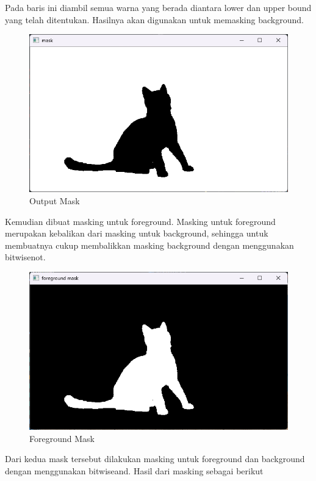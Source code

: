 \documentclass[]{article}
\begin{document}

Pada baris ini diambil semua warna yang berada diantara lower dan upper bound yang telah ditentukan. Hasilnya akan digunakan untuk memasking background.
\begin{figure}[H]
    \centering
    \includegraphics[width=12cm]{outputmask.png}
    \caption{Output Mask}
\end{figure}

Kemudian dibuat masking untuk foreground. Masking untuk foreground merupakan kebalikan dari masking untuk background, sehingga untuk membuatnya cukup membalikkan masking background dengan menggunakan bitwisenot.
\begin{figure}[H]
    \centering
    \includegraphics[width=12cm]{foregroundmask.png}
    \caption{Foreground Mask}
\end{figure}

Dari kedua mask tersebut dilakukan masking untuk foreground dan background dengan menggunakan bitwiseand. Hasil dari masking sebagai berikut
\end{document}
